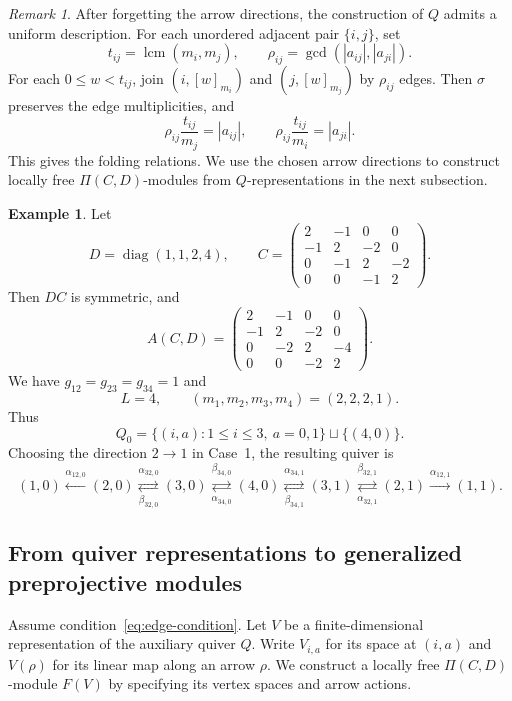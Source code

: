 \documentclass[12pt,reqno]{amsart}
\numberwithin{equation}{section}
\theoremstyle{definition}
\newtheorem{example}[theorem]{Example}
\theoremstyle{remark}
\newtheorem{remark}[theorem]{Remark}
\newcommand{\diag}{\operatorname{diag}}
\newcommand{\lcm}{\operatorname{lcm}}
\theoremstyle{plain}
\theoremstyle{plain}
\begin{document}
\begin{remark}
After forgetting the arrow directions, the construction of $Q$ admits a uniform description. For each unordered adjacent pair $\{i,j\}$, set
\[
    t_{ij}=\lcm(m_i,m_j),
    \qquad
    \rho_{ij}=\gcd(|a_{ij}|,|a_{ji}|).
\]
For each $0\le w<t_{ij}$, join $(i,[w]_{m_i})$ and $(j,[w]_{m_j})$ by $\rho_{ij}$ edges. Then $\sigma$ preserves the edge multiplicities, and
\[
    \rho_{ij}\frac{t_{ij}}{m_j}=|a_{ij}|,
    \qquad
    \rho_{ij}\frac{t_{ij}}{m_i}=|a_{ji}|.
\]
This gives the folding relations. We use the chosen arrow directions to construct locally free $\Pi(C,D)$-modules from $Q$-representations in the next subsection.
\end{remark}

\begin{example}\label{ex:auxiliary-quiver}
Let
\[
    D=\diag(1,1,2,4),
    \qquad
    C=
    \begin{pmatrix}
        2&-1&0&0\\
        -1&2&-2&0\\
        0&-1&2&-2\\
        0&0&-1&2
    \end{pmatrix}.
\]
Then $DC$ is symmetric, and
\[
    A(C,D)=
    \begin{pmatrix}
        2&-1&0&0\\
        -1&2&-2&0\\
        0&-2&2&-4\\
        0&0&-2&2
    \end{pmatrix}.
\]
We have $g_{12}=g_{23}=g_{34}=1$ and
\[
    L=4,
    \qquad
    (m_1,m_2,m_3,m_4)=(2,2,2,1).
\]
Thus
\[
    Q_0=
    \{(i,a):1\le i\le3,\ a=0,1\}
    \sqcup\{(4,0)\}.
\]
Choosing the direction $2\to1$ in Case~1, the resulting quiver is
\[
    (1,0)
    \xleftarrow{\alpha_{12,0}}
    (2,0)
    \overset{\alpha_{32,0}}
      {\underset{\beta_{32,0}}{\rightleftarrows}}
    (3,0)
    \overset{\beta_{34,0}}
      {\underset{\alpha_{34,0}}{\rightleftarrows}}
    (4,0)
    \overset{\alpha_{34,1}}
      {\underset{\beta_{34,1}}{\rightleftarrows}}
    (3,1)
    \overset{\beta_{32,1}}
      {\underset{\alpha_{32,1}}{\rightleftarrows}}
    (2,1)
    \xrightarrow{\alpha_{12,1}}
    (1,1).
\]
\end{example}

\subsection{From quiver representations to
generalized preprojective modules}
Assume condition~\eqref{eq:edge-condition}. Let $V$ be a finite-dimensional representation of the auxiliary quiver $Q$. Write $V_{i,a}$ for its space at $(i,a)$ and $V(\rho)$ for its linear map along an arrow $\rho$. We construct a locally free $\Pi(C,D)$-module $F(V)$
by specifying its vertex spaces and arrow actions.
\end{document}
